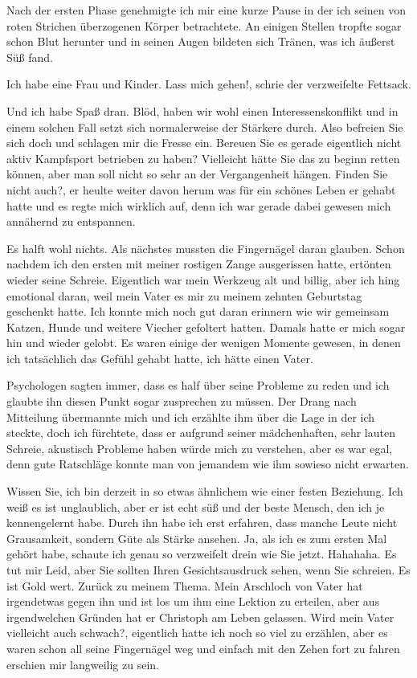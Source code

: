 \documentclass[11pt, a5paper]{article}
\newcommand{\e}{Christoph }
\begin{document}
\begin{spacing}{1.2}
		Nach der ersten Phase genehmigte ich mir eine kurze Pause in der ich seinen von roten Strichen überzogenen Körper betrachtete. An einigen Stellen tropfte sogar schon Blut herunter und in seinen Augen bildeten sich Tränen, was ich äußerst Süß fand.
		
		\frqq Ich habe eine Frau und Kinder. Lass mich gehen!\flqq , schrie der verzweifelte Fettsack.
		
		\frqq Und ich habe Spaß dran. Blöd, haben wir wohl einen Interessenskonflikt und in einem solchen Fall setzt sich normalerweise der Stärkere durch. Also befreien Sie sich doch und schlagen mir die Fresse ein. Bereuen Sie es gerade eigentlich nicht aktiv Kampfsport betrieben zu haben? Vielleicht hätte Sie das zu beginn retten können, aber man soll nicht so sehr an der Vergangenheit hängen. Finden Sie nicht auch?\flqq, er heulte weiter davon herum was für ein schönes Leben er gehabt hatte und es regte mich wirklich auf, denn ich war gerade dabei gewesen mich annähernd zu entspannen.
		
		Es halft wohl nichts. Als nächstes mussten die Fingernägel daran glauben. Schon nachdem ich den ersten mit meiner rostigen Zange ausgerissen hatte, ertönten wieder seine Schreie. Eigentlich war mein Werkzeug alt und billig, aber ich hing emotional daran, weil mein Vater es mir zu meinem zehnten Geburtstag geschenkt hatte. Ich konnte mich noch gut daran erinnern wie wir gemeinsam Katzen, Hunde und weitere Viecher gefoltert hatten. Damals hatte er mich sogar hin und wieder gelobt. Es waren einige der wenigen Momente gewesen, in denen ich tatsächlich das Gefühl gehabt hatte, ich hätte einen Vater.
		
		Psychologen sagten immer, dass es half über seine Probleme zu reden und ich glaubte ihn diesen Punkt sogar zusprechen zu müssen. Der Drang nach Mitteilung übermannte mich und ich erzählte ihm über die Lage in der ich steckte, doch ich fürchtete, dass er aufgrund seiner mädchenhaften, sehr lauten Schreie, akustisch Probleme haben würde mich zu verstehen, aber es war egal, denn gute Ratschläge konnte man von jemandem wie ihm sowieso nicht erwarten.
		
		\frqq Wissen Sie, ich bin derzeit in so etwas ähnlichem wie einer festen Beziehung. Ich weiß es ist unglaublich, aber er ist echt süß und der beste Mensch, den ich je kennengelernt habe. Durch ihn habe ich erst erfahren, dass manche Leute nicht Grausamkeit, sondern Güte als Stärke ansehen. Ja, als ich es zum ersten Mal gehört habe, schaute ich genau so verzweifelt drein wie Sie jetzt. Hahahaha. Es tut mir Leid, aber Sie sollten Ihren Gesichtsausdruck sehen, wenn Sie schreien. Es ist Gold wert. Zurück zu meinem Thema. Mein Arschloch von Vater hat irgendetwas gegen ihn und ist los um ihm eine Lektion zu erteilen, aber aus irgendwelchen Gründen hat er \e am Leben gelassen. Wird mein Vater vielleicht auch schwach?\flqq, eigentlich hatte ich noch so viel zu erzählen, aber es waren schon all seine Fingernägel weg und einfach mit den Zehen fort zu fahren erschien mir langweilig zu sein.
		

\end{spacing}
\end{document}
